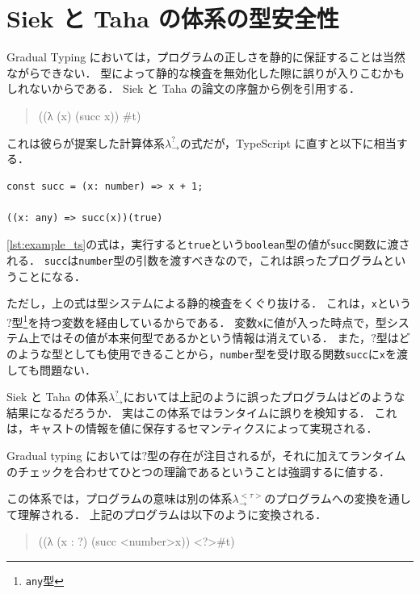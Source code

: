 \section{Siek と Taha の体系の型安全性}
\label{sec:safety_of_siek_taha}

Gradual Typing においては，プログラムの正しさを静的に保証することは当然ながらできない．
型によって静的な検査を無効化した隙に誤りが入りこむかもしれないからである．
Siek と Taha の論文の序盤から例を引用する．

\begin{quote}
    ((λ (x) (succ x)) \#t)
\end{quote}

これは彼らが提案した計算体系$\lambda^?_\to$の式だが，TypeScript に直すと以下に相当する．

\begin{lstlisting}[caption={TypeScript における例}, label={lst:example_ts}]
const succ = (x: number) => x + 1;

((x: any) => succ(x))(true)
\end{lstlisting}

\ref{lst:example_ts}の式は，実行すると\texttt{true}という\texttt{boolean}型の値が\texttt{succ}関数に渡される．
\texttt{succ}は\texttt{number}型の引数を渡すべきなので，これは誤ったプログラムということになる．

ただし，上の式は型システムによる静的検査をくぐり抜ける．
これは，\texttt{x}という$?$型\footnote{\texttt{any}型}を持つ変数を経由しているからである．
変数\texttt{x}に値が入った時点で，型システム上ではその値が本来何型であるかという情報は消えている．
また，$?$型はどのような型としても使用できることから，\texttt{number}型を受け取る関数\texttt{succ}に\texttt{x}を渡しても問題ない．

Siek と Taha の体系$\lambda^?_\to$においては上記のように誤ったプログラムはどのような結果になるだろうか．
実はこの体系ではランタイムに誤りを検知する．
これは，キャストの情報を値に保存するセマンティクスによって実現される．

Gradual typing においては$?$型の存在が注目されるが，それに加えてランタイムのチェックを合わせてひとつの理論であるということは強調するに値する．

この体系では，プログラムの意味は別の体系$\lambda^{<\tau>}_\to$のプログラムへの変換を通して理解される．
上記のプログラムは以下のように変換される．

\begin{quote}
    ((λ (x : ?) (succ <number>x)) <?>\#t)
\end{quote}

